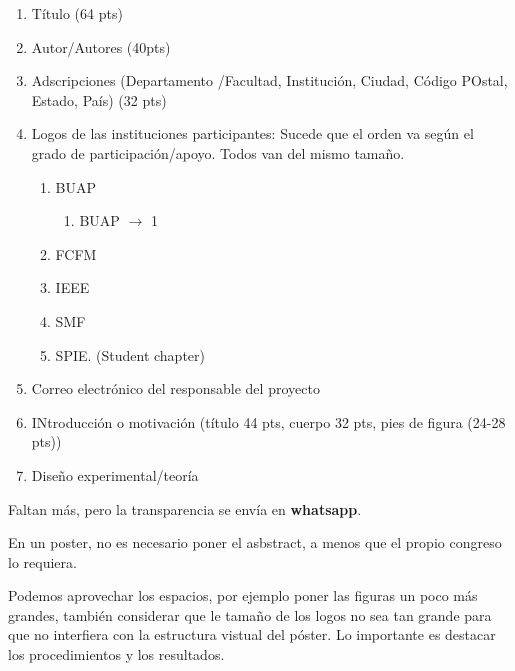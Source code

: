 \documentclass{article}
\begin{document}
 \begin{enumerate}
 	\item Título (64 pts)\\
 	\item Autor/Autores (40pts)\\
 	\item Adscripciones (Departamento /Facultad, Institución, Ciudad, Código POstal, Estado, País) (32 pts)\\
 	\item Logos de las instituciones participantes: Sucede que el orden va según el grado de participación/apoyo. Todos van del mismo tamaño.
 	\begin{enumerate}
 		\item BUAP\\
 		\begin{enumerate}
 			\item BUAP $\to$ 1\\
 		\end{enumerate}
 		\item FCFM\\
 		\item IEEE\\
 		\item SMF\\
 		\item SPIE. (Student chapter)
 	\end{enumerate}
 	\item Correo electrónico del responsable del proyecto\\
 	\item INtroducción o motivación (título 44 pts, cuerpo 32 pts, pies de figura (24-28 pts))\\
 	\item Diseño experimental/teoría
 \end{enumerate} \vspace{0.5cm}
 
 Faltan más, pero la transparencia se envía en \textcolor{Apple Green}{\textbf{whatsapp}}.
 
 
 En un poster, no es necesario poner el asbstract, a menos que el propio congreso lo requiera.
 
 
 Podemos aprovechar los espacios, por ejemplo poner las figuras un poco más grandes, también considerar que le tamaño de los logos no sea tan grande para que no interfiera con la estructura vistual del póster. Lo importante es destacar los procedimientos y los resultados. \vspace{0.5cm}
 
\end{document}
